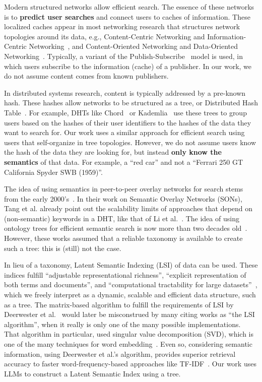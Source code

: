 Modern structured networks allow efficient search.
The essence of these networks is to \textbf{predict user searches} and connect users to caches of information.
These localized caches appear in most networking research that structures network topologies around its data, e.g., Content-Centric Networking and Information-Centric Networking~\cite{vasilakos2015information}, and Content-Oriented Networking and Data-Oriented Networking~\cite{cho2008content}.
Typically, a variant of the Publish-Subscribe~\cite{vansteen2018distributed} model is used, in which users subscribe to the information (cache) of a publisher.
In our work, we do not assume content comes from known publishers.

In distributed systems research, content is typically addressed by a pre-known hash.
These hashes allow networks to be structured as a tree, or Distributed Hash Table~\cite{vansteen2018distributed}.
For example, DHTs like Chord~\cite{stoica2003chord} or Kademlia~\cite{maymounkov2002kademlia} use these trees to group users based on the hashes of their user identifiers to the hashes of the data they want to search for.
Our work uses a similar approach for efficient search using users that self-organize in tree topologies.
However, we do not assume users know the hash of the data they are looking for, but instead \textbf{only know the semantics} of that data.
For example, a ``red car'' and not a ``Ferrari 250 GT California Spyder SWB (1959)''.

The idea of using semantics in peer-to-peer overlay networks for search stems from the early 2000's~\cite{tang2003peer}.
In their work on Semantic Overlay Networks (SONs), Tang et al. already point out the scalability limits of approaches that depend on (non-semantic) keywords in a DHT, like that of Li et al.~\cite{li2003feasibility}.
The idea of using ontology trees for efficient semantic search is now more than two decades old~\cite{crespo2004semantic}.
However, these works assumed that a reliable taxonomy is available to create such a tree: this is (still) not the case.

In lieu of a taxonomy, Latent Semantic Indexing (LSI) of data can be used.
These indices fulfill ``adjustable representational richness'', ``explicit representation of both terms and documents'', and ``computational tractability for large datasets''~\cite{deerwester1990indexing}, which we freely interpret as a dynamic, scalable and efficient data structure, such as a tree.
The matrix-based algorithm to fulfill the requirements of LSI by Deerwester et al.~\cite{deerwester1990indexing} would later be misconstrued by many citing works as ``the LSI algorithm'', when it really is only one of the many possible implementations.
That algorithm in particular, used singular value decomposition (SVD), which is one of the many techniques for word embedding~\cite{johnson2024detailed}.
Even so, considering semantic information, using Deerwester et al.'s algorithm, provides superior retrieval accuracy to faster word-frequency-based approaches like TF-IDF~\cite{zhang2011comparative}. 
Our work uses LLMs to construct a Latent Semantic Index using a tree.

